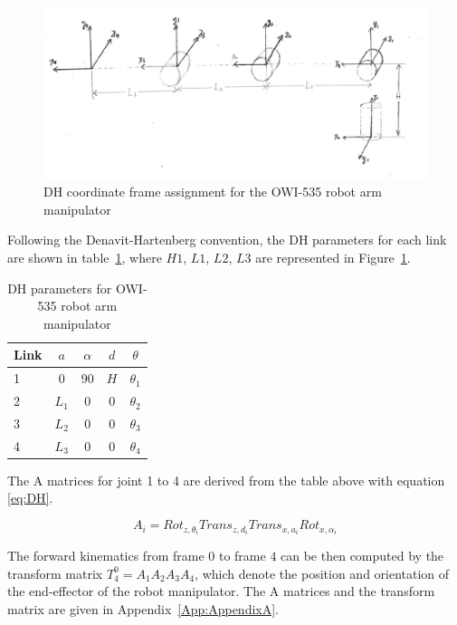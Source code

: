 \documentclass[paper=letter, fontsize=10pt]{scrartcl}	%
\numberwithin{equation}{section}															%
\numberwithin{figure}{section}																%
\numberwithin{table}{section}																%
\begin{document}
\begin{figure}[h!]
  \centering
    \includegraphics[width=1\textwidth]{./Images/frame_assign}
    \caption{DH coordinate frame assignment for the OWI-535 robot arm manipulator}
    \label{fig:frame_assign}
\end{figure}
Following the Denavit-Hartenberg convention, the DH parameters for each link are shown in table~\ref{tab:DH}, where $H1$, $L1$, $L2$, $L3$ are represented in Figure~\ref{fig:frame_assign}.

\begin{table} 
\caption{DH parameters for OWI-535 robot arm manipulator}
\label{tab:DH}
\begin{center}
\begin{tabular}{lcccc}
\toprule
Link & $a$ & $\alpha$ & $d$ & $\theta$\\
\midrule
1 & 0 & 90 & $H$ & $\theta_1$\\
2 & $L_1$ & 0 & 0 & $\theta_2$\\
3 & $L_2$ & 0 & 0 & $\theta_3$\\
4 & $L_3$ & 0 & 0 & $\theta_4$\\
\bottomrule
\end{tabular}
\end{center}
\end{table}

The A matrices for joint 1 to 4 are derived from the table above with equation \eqref{eq:DH}.

\begin{equation}\label{eq:DH}
{{A}_{i}}=Ro{{t}_{z,{{\theta }_{i}}}}Tran{{s}_{z,{{d}_{i}}}}Tran{{s}_{x,{{a}_{i}}}}Ro{{t}_{x,{{\alpha }_{i}}}}  
\end{equation}

The forward kinematics from frame $0$ to frame $4$ can be then computed by the transform matrix $T_{4}^{0}={{A}_{1}}{{A}_{2}}{{A}_{3}}{{A}_{4}}$, which denote the position and orientation of the end-effector of the robot manipulator. The A matrices and the transform matrix are given in Appendix~\ref{App:AppendixA}.
\end{document}
